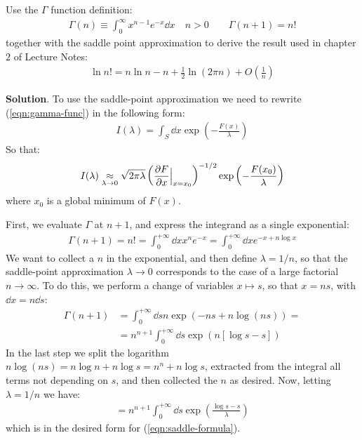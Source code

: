 \documentclass[../template.tex]{subfiles}
\begin{document}
\begin{exo}
    Use the $\Gamma$ function definition:
    \begin{align}
        \Gamma(n) \equiv \int_0^\infty x^{n-1} e^{-x} \dd{x} \quad n > 0\qquad \Gamma(n+1) = n! \label{eqn:gamma-func}
    \end{align}
    together with the saddle point approximation to derive the result used in chapter $2$ of Lecture Notes:
    \begin{align}
        \ln n! = n\ln n - n + \frac{1}{2} \ln(2 \pi n) + O\left(\frac{1}{n} \right) \label{eqn:stirling}
    \end{align} 

    \medskip

    \textbf{Solution}. To use the saddle-point approximation we need to rewrite (\ref{eqn:gamma-func}) in the following form:
    \begin{align}
        I(\lambda) = \int_S \dd{x} \exp\left(-\frac{F(x)}{\lambda} \right)
    \end{align}
    So that:
    \begin{align}
        I(\lambda) \underset{\lambda \to 0}{\approx}  \sqrt{2 \pi \lambda} \left(\pdv{F}{x} (x) \Big|_{x=x_0}\right)^{-1/2} \exp\left(-\frac{F(x_0)}{\lambda} \right)
        \label{eqn:saddle-formula}
    \end{align}
    where $x_0$ is a global minimum of $F(x)$.  

    First, we evaluate $\Gamma$ at $n+1$, and express the integrand as a single exponential:
    \begin{align*}
        \Gamma(n+1) = n! = \int_0^{+\infty} \dd{x} x^n e^{-x}  = \int_{0}^{+\infty} \dd{x} e^{-x + n \log x} 
    \end{align*}
    We want to collect a $n$ in the exponential, and then define $\lambda = 1/n$, so that the saddle-point approximation $\lambda \to 0$ corresponds to the case of a large factorial $n \to \infty$. To do this, we perform a change of variables $x \mapsto s$, so that $x = n s$, with $\dd{x} = n \dd{s}$:
    \begin{align*}
        \Gamma(n+1) &= \int_0^{+\infty} \dd{s} n \exp(-ns + n \log(ns))= \\
        &= n^{n+1} \int_0^{+\infty} \dd{s} \exp(n[\log s - s])
    \end{align*}
    In the last step we split the logarithm $n\log(ns) = n\log n + n\log s = n^n + n\log s$, extracted from the integral all terms not depending on $s$, and then collected the $n$ as desired. Now, letting $\lambda = 1/n$ we have:
    \begin{align*}
        = n^{n+1} \int_0^{+\infty} \dd{s} \exp\left(\frac{\log s - s}{\lambda} \right)
    \end{align*}
    which is in the desired form for (\ref{eqn:saddle-formula}).


\end{exo}
\end{document}
